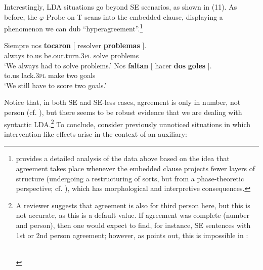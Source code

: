 \documentclass[output=paper]{langsci/langscibook}
\begin{document}
Interestingly, LDA situations go beyond SE scenarios, as shown in (11). As before, the $\varphi $-Probe on T scans into the embedded clause, displaying a phenomenon we can dub “hyperagreement”.\footnote{\citet{Fernández-Serrano2016} provides a detailed analysis of the data above based on the idea that agreement takes place whenever the embedded clause projects fewer layers of structure (undergoing a restructuring of sorts, but from a phase-theoretic perspective; cf. \citealt{Gallego2009}), which has morphological and interpretive consequences.}\largerpage[-3]

\ea%
    \label{ex:gallego:11}
    \ea
    \gll Siempre   nos    \textbf{tocaron}              [ resolver  \textbf{problemas} ].\\
         always    to.us  be.our.turn.\textsc{3pl} {} solve       problems\\
    \glt ‘We always had to solve problems.’
    \ex
    \gll Nos   \textbf{faltan}    [ hacer  \textbf{dos}  \textbf{goles} ].\\
         to.us  lack.\textsc{3pl} {} make two goals\\
    \glt ‘We still have to score two goals.’
    \z
\z    

Notice that, in both SE and SE-less cases, agreement is only in number, not person (cf. \citealt{Etxepare2006}), but there seems to be robust evidence that we are dealing with syntactic LDA.\footnote{%
    A reviewer suggests that agreement is also for third person here, but this is not accurate, as this is a default value. If agreement was complete (number and person), then one would expect to find, for instance, SE sentences with 1st or 2nd person agreement; however, as \citet{López2007} points out, this is impossible in :
    
    \ea {} \citep[127]{López2007}\\
    \z
    \z} 
To conclude, consider previously unnoticed situations in which intervention-like effects arise in the context of an auxiliary: 
\end{document}
